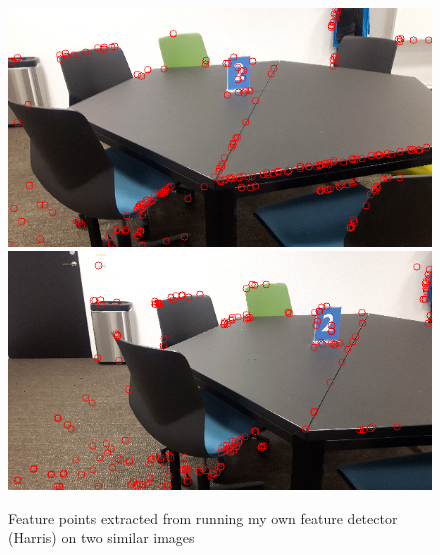 \documentclass[a4paper, titlepage,12pt]{article}
\begin{document}
	\begin{figure}[h!]
		\begin{center}
		\includegraphics[scale=0.3]{./harris_out_1.png}
		\includegraphics[scale=0.3]{./harris_out_2.png}
			\caption{Feature points extracted from running my own feature detector (Harris) on two similar images}
		\end{center}
	\end{figure}
\end{document}
